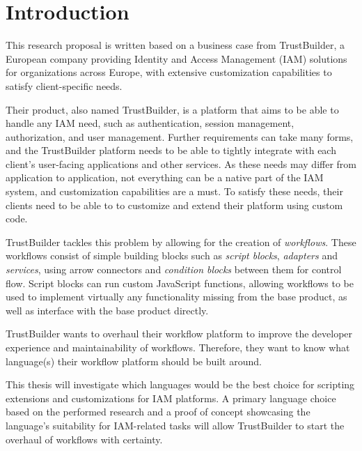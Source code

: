 
\section{Introduction}%
\label{sec:introduction}

This research proposal is written based on a business case from TrustBuilder, a European company providing Identity and Access Management (IAM) solutions for organizations across Europe, with extensive customization capabilities to satisfy client-specific needs.

Their product, also named TrustBuilder, is a platform that aims to be able to handle any IAM need, such as authentication, session management, authorization, and user management. Further requirements can take many forms, and the TrustBuilder platform needs to be able to tightly integrate with each client’s user-facing applications and other services. As these needs may differ from application to application, not everything can be a native part of the IAM system, and customization capabilities are a must. To satisfy these needs, their clients need to be able to to customize and extend their platform using custom code.

TrustBuilder tackles this problem by allowing for the creation of \emph{workflows}. These workflows consist of simple building blocks such as \emph{script blocks}, \emph{adapters} and \emph{services}, using arrow connectors and \emph{condition blocks} between them for control flow. Script blocks can run custom JavaScript functions, allowing workflows to be used to implement virtually any functionality missing from the base product, as well as interface with the base product directly.

TrustBuilder wants to overhaul their workflow platform to improve the developer experience and maintainability of workflows. Therefore, they want to know what language(s) their workflow platform should be built around.

This thesis will investigate which languages would be the best choice for scripting extensions and customizations for IAM platforms. A primary language choice based on the performed research and a proof of concept showcasing the language’s suitability for IAM-related tasks will allow TrustBuilder to start the overhaul of workflows with certainty.


